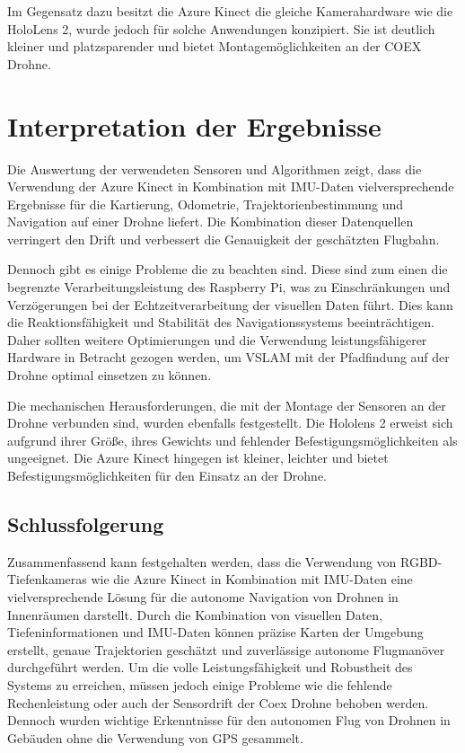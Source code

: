 Im Gegensatz dazu besitzt die Azure Kinect die gleiche Kamerahardware wie die HoloLens 2, wurde jedoch für solche Anwendungen konzipiert. Sie ist deutlich kleiner und platzsparender und bietet Montagemöglichkeiten an der COEX Drohne. 

\section{Interpretation der Ergebnisse}

Die Auswertung der verwendeten Sensoren und Algorithmen zeigt, dass die Verwendung der Azure Kinect in Kombination mit \ac{IMU}-Daten vielversprechende Ergebnisse für die Kartierung, Odometrie, Trajektorienbestimmung und Navigation auf einer Drohne liefert. Die Kombination dieser Datenquellen verringert den Drift und verbessert die Genauigkeit der geschätzten Flugbahn.

Dennoch gibt es einige Probleme die zu beachten sind. Diese sind zum einen die begrenzte Verarbeitungsleistung des Raspberry Pi, was zu Einschränkungen und Verzögerungen bei der Echtzeitverarbeitung der visuellen Daten führt. Dies kann die Reaktionsfähigkeit und Stabilität des Navigationssystems beeinträchtigen. Daher sollten weitere Optimierungen und die Verwendung leistungsfähigerer Hardware in Betracht gezogen werden, um \ac{VSLAM} mit der Pfadfindung auf der Drohne optimal einsetzen zu können.

Die mechanischen Herausforderungen, die mit der Montage der Sensoren an der Drohne verbunden sind, wurden ebenfalls festgestellt. Die Hololens 2 erweist sich aufgrund ihrer Größe, ihres Gewichts und fehlender Befestigungsmöglichkeiten als ungeeignet. Die Azure Kinect hingegen ist kleiner, leichter und bietet Befestigungsmöglichkeiten für den Einsatz an der Drohne.

\subsection{Schlussfolgerung}
Zusammenfassend kann festgehalten werden, dass die Verwendung von RGBD-Tiefenkameras wie die Azure Kinect in Kombination mit \ac{IMU}-Daten eine vielversprechende Lösung für die autonome Navigation von Drohnen in Innenräumen darstellt. Durch die Kombination von visuellen Daten, Tiefeninformationen und \ac{IMU}-Daten können präzise Karten der Umgebung erstellt, genaue Trajektorien geschätzt und zuverlässige autonome Flugmanöver durchgeführt werden. Um die volle Leistungsfähigkeit und Robustheit des Systems zu erreichen, müssen jedoch einige Probleme wie die fehlende Rechenleistung oder auch der Sensordrift der Coex Drohne behoben werden. \\
Dennoch wurden wichtige Erkenntnisse für den autonomen Flug von Drohnen in Gebäuden ohne die Verwendung von \ac{GPS} gesammelt.



